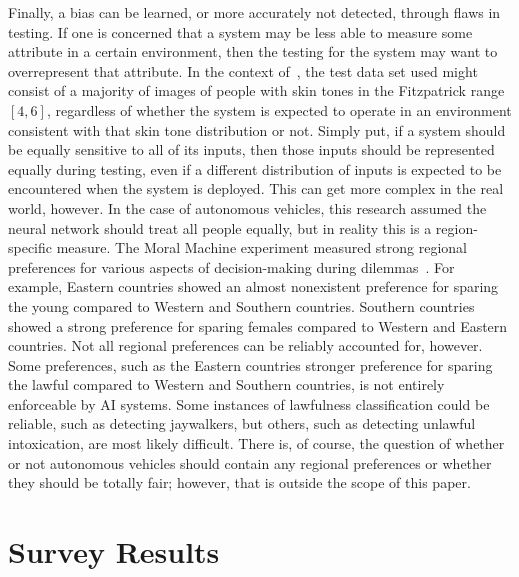 \documentclass[]{report}
\begin{document}
Finally, a bias can be learned, or more accurately not detected, through flaws in testing. If one is
concerned that a system may be less able to measure some attribute in a certain environment, then
the testing for the system may want to overrepresent that attribute. In the context
of~\cite{wilson2019predictive}, the test data set used might consist of a majority of images of
people with skin tones in the Fitzpatrick range $[4, 6]$, regardless of whether the system is
expected to operate in an environment consistent with that skin tone distribution or not. Simply
put, if a system should be equally sensitive to all of its inputs, then those inputs should be
represented equally during testing, even if a different distribution of inputs is expected to be
encountered when the system is deployed. This can get more complex in the real world, however. In
the case of autonomous vehicles, this research assumed the neural network should treat all people
equally, but in reality this is a region-specific measure. The Moral Machine experiment measured
strong regional preferences for various aspects of decision-making during
dilemmas~\cite{awad2018moral}. For example, Eastern countries showed an almost nonexistent
preference for sparing the young compared to Western and Southern countries. Southern countries
showed a strong preference for sparing females compared to Western and Eastern countries. Not all
regional preferences can be reliably accounted for, however. Some preferences, such as the Eastern
countries stronger preference for sparing the lawful compared to Western and Southern countries, is
not entirely enforceable by AI systems. Some instances of lawfulness classification could be
reliable, such as detecting jaywalkers, but others, such as detecting unlawful intoxication, are
most likely difficult. There is, of course, the question of whether or not autonomous vehicles
should contain any regional preferences or whether they should be totally fair; however, that is
outside the scope of this paper.

\FloatBarrier
\section{Survey Results}
\end{document}
